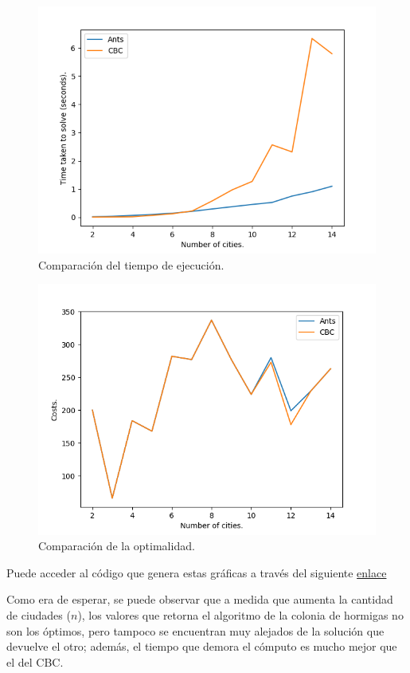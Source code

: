 \documentclass[titlepage, 11pt]{scrartcl}
\begin{document}
 			\begin{figure}[H]
				\includegraphics[]{pictures/ExecutionTime.png}
				\caption{Comparación del tiempo de ejecución.}
 			\end{figure}
 			\begin{figure}[H]
 				\includegraphics[]{pictures/Optimality.png}
 				\caption{Comparación de la optimalidad.}
 			\end{figure}
 			
			Puede acceder al código que genera estas gráficas a través del siguiente \href{main.py}{enlace}
			
			Como era de esperar, se puede observar que a medida que aumenta la cantidad de ciudades ($n$), los valores que retorna el algoritmo de la colonia de hormigas no son los óptimos, pero tampoco se encuentran muy alejados de la solución que devuelve el otro; además, el tiempo que demora el cómputo es mucho mejor que el del CBC.

 		
\end{document}
